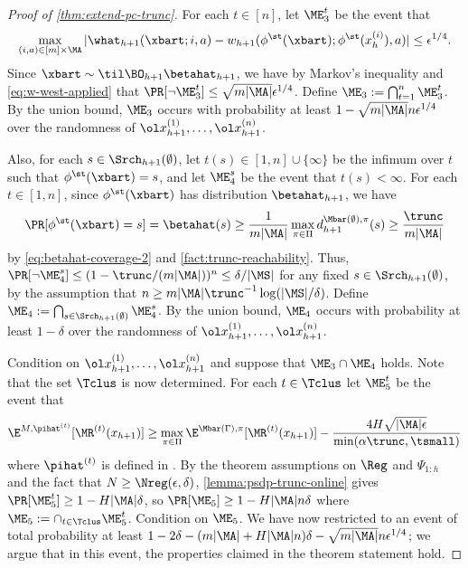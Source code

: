 \begin{proof}[Proof of \cref{thm:extend-pc-trunc}]
For each $t \in [n]$, let $\ME_3^t$ be the event that 
\[\max_{(i,a)\in[m]\times\MA} |\what_{h+1}(\xbart;i,a) - w_{h+1}(\phi^\st(\xbart); \phi^\st(x_h^{(i)}),a)| \leq \epsilon^{1/4}.\] Since $\xbart \sim \til\BO_{h+1}\betahat_{h+1}$, we have by Markov's inequality and \cref{eq:w-west-applied} that $\Pr[\lnot \ME_3^t] \leq \sqrt{m|\MA|}\epsilon^{1/4}$. Define $\ME_3 := \bigcap_{t=1}^n \ME_3^t$. By the union bound, $\ME_3$ occurs with probability at least $1-\sqrt{m|\MA|}n\epsilon^{1/4}$ over the randomness of $\ol x_{h+1}^{(1)},\dots,\ol x_{h+1}^{(n)}$. 

Also, for each $s \in \Srch_{h+1}(\emptyset)$, let $t(s) \in [1,n] \cup \{\infty\}$ be the infimum over $t$ such that $\phi^\st(\xbart) = s$, and let $\ME_4^s$ be the event that $t(s) < \infty$. For each $t \in [1,n]$, since $\phi^\st(\xbart)$ has distribution $\betahat_{h+1}$, we have 
\[\Pr[\phi^\st(\xbart)=s] = \betahat(s)  \geq \frac{1}{m|\MA|} \max_{\pi\in\Pi} d^{\Mbar(\emptyset),\pi}_{h+1}(s) \geq \frac{\trunc}{m|\MA|}\]
by \cref{eq:betahat-coverage-2} and \cref{fact:trunc-reachability}.
Thus, $\Pr[\lnot \ME_4^s] \leq (1-\trunc/(m|\MA|))^n \leq \delta/|\MS|$ for any fixed $s \in \Srch_{h+1}(\emptyset)$, by the assumption that $n \geq m|\MA|\trunc^{-1} \log(|\MS|/\delta)$. Define $\ME_4 := \bigcap_{s \in \Srch_{h+1}(\emptyset)} \ME_4^s$. By the union bound, $\ME_4$ occurs with probability at least $1-\delta$ over the randomness of $\ol x_{h+1}^{(1)},\dots,\ol x_{h+1}^{(n)}$.

Condition on $\ol x_{h+1}^{(1)},\dots,\ol x_{h+1}^{(n)}$ and suppose that $\ME_3 \cap \ME_4$ holds. Note that the set $\Tclus$ is now determined. For each $t \in \Tclus$ let $\ME_5^t$ be the event that
\[\E^{M,\pihat^{(t)}}[\MR^{(t)}(x_{h+1})] \geq \max_{\pi\in\Pi} \E^{\Mbar(\Gamma),\pi}[\MR^{(t)}(x_{h+1})] - \frac{4H\sqrt{|\MA|\epsilon}}{\min(\alpha\trunc,\tsmall)}\]
where $\pihat^{(t)}$ is defined in . By the theorem assumptions on $\Reg$ and $\Psi_{1:h}$ and the fact that $N \geq \Nreg(\epsilon,\delta)$, \cref{lemma:psdp-trunc-online} gives $\Pr[\ME_5^t] \geq 1-H|\MA|\delta$, so $\Pr[\ME_5] \geq 1-H|\MA|n\delta$ where $\ME_5 := \cap_{t \in \Tclus} \ME_5^t$. Condition on $\ME_5$. We have now restricted to an event of total probability at least $1 - 2\delta - (m|\MA|+H|\MA|n)\delta - \sqrt{m|\MA|}n\epsilon^{1/4}$; we argue that in this event, the properties claimed in the theorem statement hold.


\end{proof}
